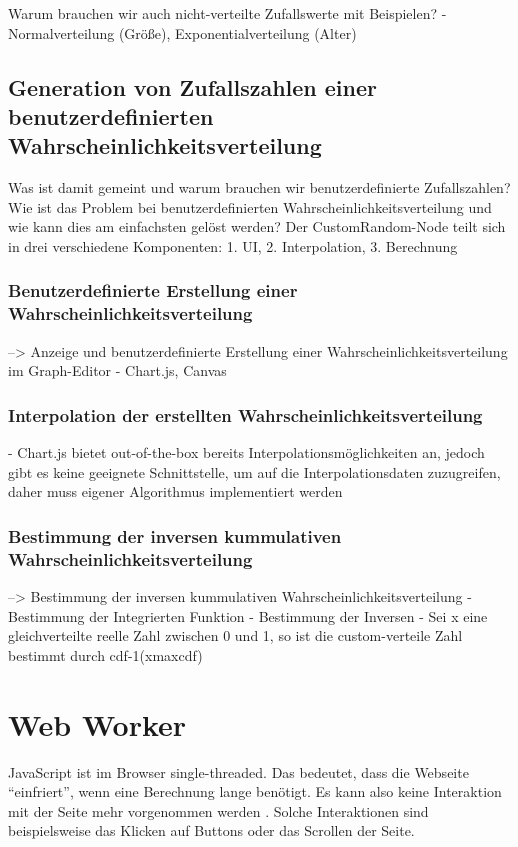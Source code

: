 Warum brauchen wir auch nicht-verteilte Zufallswerte mit Beispielen?
- Normalverteilung (Größe), Exponentialverteilung (Alter)

\subsection{Generation von Zufallszahlen einer benutzerdefinierten Wahrscheinlichkeitsverteilung}

Was ist damit gemeint und warum brauchen wir benutzerdefinierte Zufallszahlen?
Wie ist das Problem bei benutzerdefinierten Wahrscheinlichkeitsverteilung und wie kann dies am einfachsten gelöst werden?
Der CustomRandom-Node teilt sich in drei verschiedene Komponenten: 1. UI, 2. Interpolation, 3. Berechnung

\subsubsection{Benutzerdefinierte Erstellung einer Wahrscheinlichkeitsverteilung}

--> Anzeige und benutzerdefinierte Erstellung einer Wahrscheinlichkeitsverteilung im Graph-Editor
- Chart.js, Canvas

\subsubsection{Interpolation der erstellten Wahrscheinlichkeitsverteilung}

- Chart.js bietet out-of-the-box bereits Interpolationsmöglichkeiten an, jedoch gibt es keine geeignete Schnittstelle, um auf die Interpolationsdaten zuzugreifen, daher muss eigener Algorithmus implementiert werden

\subsubsection{Bestimmung der inversen kummulativen Wahrscheinlichkeitsverteilung}
--> Bestimmung der inversen kummulativen Wahrscheinlichkeitsverteilung
- Bestimmung der Integrierten Funktion
- Bestimmung der Inversen
- Sei x eine gleichverteilte reelle Zahl zwischen 0 und 1, so ist die custom-verteile Zahl bestimmt durch cdf-1(xmaxcdf)

\section{Web Worker}
JavaScript ist im Browser single-threaded. Das bedeutet, dass die Webseite \enquote{einfriert}, wenn eine Berechnung lange benötigt. Es kann also keine Interaktion mit der Seite mehr vorgenommen werden \cite{googledev:webworkers}. Solche Interaktionen sind beispielsweise das Klicken auf Buttons oder das Scrollen der Seite.

